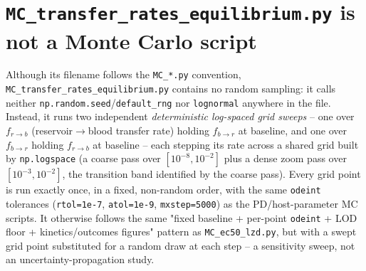 \documentclass[11pt]{article}
\begin{document}
\section{\texttt{MC\_transfer\_rates\_equilibrium.py} is not a Monte Carlo script}
\label{sec:not-mc}

Although its filename follows the \texttt{MC\_*.py} convention,
\texttt{MC\_transfer\_rates\_equilibrium.py} contains no random sampling: it
calls neither \texttt{np.random.seed}/\texttt{default\_rng} nor
\texttt{lognormal} anywhere in the file. Instead, it runs two independent
\emph{deterministic log-spaced grid sweeps} -- one over $f_{r\to b}$
(reservoir$\to$blood transfer rate) holding $f_{b\to r}$ at baseline, and one
over $f_{b\to r}$ holding $f_{r\to b}$ at baseline -- each stepping its rate
across a shared grid built by \texttt{np.logspace} (a coarse pass over
$[10^{-8}, 10^{-2}]$ plus a dense zoom pass over $[10^{-3}, 10^{-2}]$, the
transition band identified by the coarse pass). Every grid point is run
exactly once, in a fixed, non-random order, with the same
\texttt{odeint} tolerances (\texttt{rtol=1e-7}, \texttt{atol=1e-9},
\texttt{mxstep=5000}) as the PD/host-parameter MC scripts. It otherwise
follows the same "fixed baseline + per-point \texttt{odeint} + LOD floor +
kinetics/outcomes figures" pattern as \texttt{MC\_ec50\_lzd.py}, but with a
swept grid point substituted for a random draw at each step -- a sensitivity
sweep, not an uncertainty-propagation study.
\end{document}
